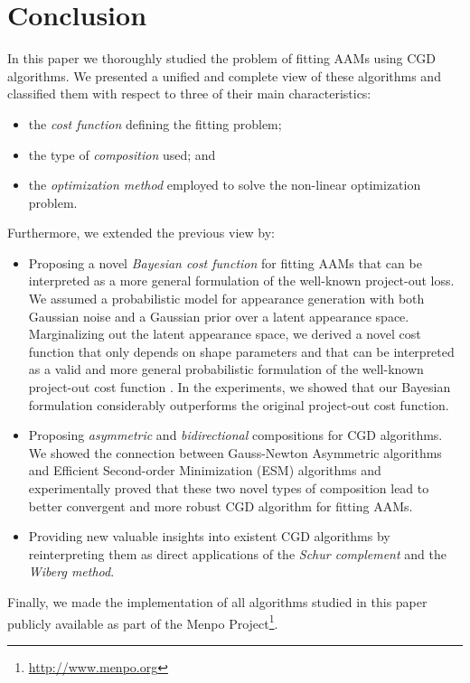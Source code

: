 \section{Conclusion}
\label{sec:conclusion}

In this paper we thoroughly studied the problem of fitting AAMs using CGD algorithms. We presented a unified and complete view of these algorithms and classified them with respect to three of their main characteristics:
\begin{itemize} 
	\item the \emph{cost function} defining the fitting problem; 
	\item the type of \emph{composition} used; and 
	\item the \emph{optimization method} employed to solve the non-linear optimization problem. 
\end{itemize}

Furthermore, we extended the previous view by:
\begin{itemize}
	\item Proposing a novel \emph{Bayesian cost function} for fitting AAMs that can be interpreted as a more general formulation of the well-known project-out loss. We assumed a probabilistic model for appearance generation with both Gaussian noise and a Gaussian prior over a latent appearance space. Marginalizing out the latent appearance space, we derived a novel cost function that only depends on shape parameters and that can be interpreted as a valid and more general probabilistic formulation of the well-known project-out cost function \cite{Matthews2004}. In the experiments, we showed that our Bayesian formulation considerably outperforms the original project-out cost function.
	
	\item Proposing \emph{asymmetric} and \emph{bidirectional} compositions for CGD algorithms. We showed the connection between Gauss-Newton Asymmetric algorithms and Efficient Second-order Minimization (ESM) algorithms and experimentally proved that these two novel types of composition lead to better convergent and more robust CGD algorithm for fitting AAMs.
	
	\item Providing new valuable insights into existent CGD algorithms by reinterpreting them as direct applications of the \emph{Schur complement} and the \emph{Wiberg method}.
\end{itemize} 

Finally, we made the implementation of all algorithms studied in this paper publicly available as part of the Menpo Project\footnote{\url{http://www.menpo.org}}.

